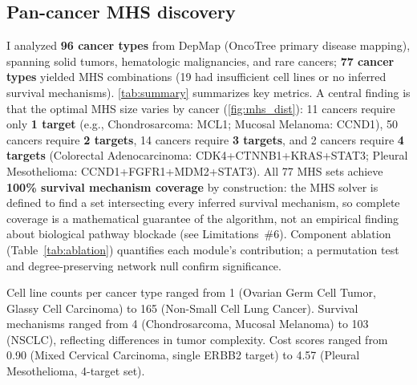 \documentclass[times, twoside, watermark]{zHenriquesLab-StyleBioRxiv}
\begin{document}
\subsection*{Pan-cancer MHS discovery}
I analyzed \textbf{96 cancer types} from DepMap (OncoTree primary disease mapping), spanning solid tumors, hematologic malignancies, and rare cancers; \textbf{77 cancer types} yielded MHS combinations (19 had insufficient cell lines or no inferred survival mechanisms). \cref{tab:summary} summarizes key metrics. A central finding is that the optimal MHS size varies by cancer (\cref{fig:mhs_dist}): 11 cancers require only \textbf{1 target} (e.g., Chondrosarcoma: MCL1; Mucosal Melanoma: CCND1), 50 cancers require \textbf{2 targets}, 14 cancers require \textbf{3 targets}, and 2 cancers require \textbf{4 targets} (Colorectal Adenocarcinoma: CDK4+CTNNB1+KRAS+STAT3; Pleural Mesothelioma: CCND1+FGFR1+MDM2+STAT3). All 77 MHS sets achieve \textbf{100\% survival mechanism coverage} by construction: the MHS solver is defined to find a set intersecting every inferred survival mechanism, so complete coverage is a mathematical guarantee of the algorithm, not an empirical finding about biological pathway blockade (see Limitations~\#6). Component ablation (Table~\ref{tab:ablation}) quantifies each module's contribution; a permutation test and degree-preserving network null confirm significance.

Cell line counts per cancer type ranged from 1 (Ovarian Germ Cell Tumor, Glassy Cell Carcinoma) to 165 (Non-Small Cell Lung Cancer). Survival mechanisms ranged from 4 (Chondrosarcoma, Mucosal Melanoma) to 103 (NSCLC), reflecting differences in tumor complexity. Cost scores ranged from 0.90 (Mixed Cervical Carcinoma, single ERBB2 target) to 4.57 (Pleural Mesothelioma, 4-target set).
\end{document}
